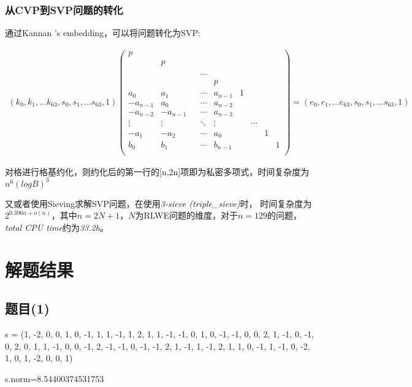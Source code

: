 \documentclass[12pt,a4paper]{article}
\newcommand{\supercite}[2][]{\textsuperscript{\citep[#1]{#2}}}
\numberwithin{equation}{section}
\begin{document}
\subsubsection{从CVP到SVP问题的转化}
通过Kannan 's embedding\supercite[]{kannan1987}，可以将问题转化为SVP:

\begin{align}
	(k_0,k_1,...k_{63},s_0,s_1,...s_{63},1)
	\left(
	\begin{smallmatrix}
			p\\
			&p\\
			&&\\
			&&&\cdots\\
			&&&&p\\
			a_0    &a_1    &   &\cdots &a_{n-1}            &1\\
			-a_{n-1}&a_0    &   &\cdots &a_{n-2}       &&\\
			-a_{n-2}&-a_{n-1}&   &\cdots &a_{n-3}  &&\\
			\vdots &\vdots &&\ddots &\vdots             &&\cdots\\
			-a_1    &-a_2    &   &\cdots &a_0 &&&1\\
			b_0    &b_1    &   &\cdots &b_{n-1}&&&&1\\
		\end{smallmatrix}
	\right)
	=
	(e_0,e_1,...e_{63},s_0,s_1,...s_{63},1)
\end{align}

对格进行格基约化，则约化后的第一行的[n,2n]项即为私密多项式，时间复杂度为$n^6 (logB)^3$\cite{adleman1981}

又或者使用Sieving求解SVP问题，在使用\textit{3-sieve (triple\_sieve)}时，
时间复杂度为$2^{0.396n+o(n)}$，其中$n=2N+1$，$N$为RLWE问题的维度，对于$n=129$的问题，
\textit{total CPU time}约为\textit{33.2h}\cite{cryptoeprint:2019/089}。


\section{解题结果}

\subsection{题目(1)}


s = (1, -2, 0, 0, 1, 0, -1, 1, 1, -1, 1, 2, 1, 1,
-1, -1, 0, 1, 0, -1, -1, 0, 0, 2, 1, -1, 0, -1, 0, 2, 0, 1,
1, -1, 0, 0, -1, 2, -1, -1, 0, -1, -1, 2, 1, -1, 1, -1, 2, 1, 1, 0,
-1, 1, -1, 0, -2, 1, 0, 1, -2, 0, 0, 1)

s.norm=8.54400374531753
\end{document}
